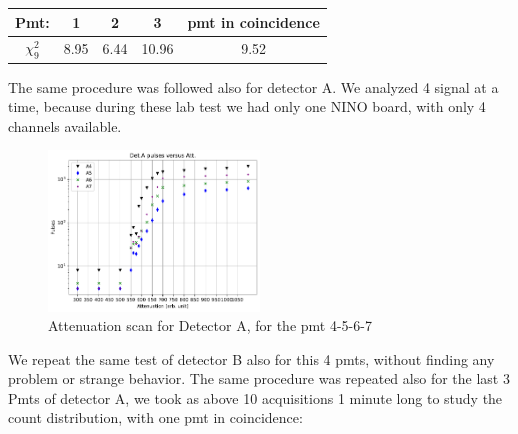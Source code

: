  
\begingroup
\setlength{\tabcolsep}{8pt} %
\renewcommand{\arraystretch}{1.2} %
\begin{center}
\begin{tabular}{c|c|c|c|c}
\hline 
Pmt: & 1 & 2 & 3 & pmt in coincidence \\ 
\hline
$\chi^{2}_{9}$ & 8.95 & 6.44 & 10.96 & 9.52\\ 
\hline
\end{tabular} 
\end{center}
\endgroup
\smallskip


The same procedure was followed also for detector A. We analyzed 4 signal at a time, because during these lab test we had only one NINO board, with only 4 channels available.
\begin{figure}[hbtp]
\centering
\includegraphics[width = 0.5\textwidth]{Analysis/AttenuationA(4-7).pdf}
\caption{Attenuation scan for Detector A, for the pmt 4-5-6-7}
\end{figure}

We repeat the same test of detector B also for this 4 pmts, without finding any problem or strange behavior. The same procedure was repeated also for the last 3 Pmts of detector A, we took as above 10 acquisitions 1 minute long to study the count distribution, with one pmt in coincidence:

